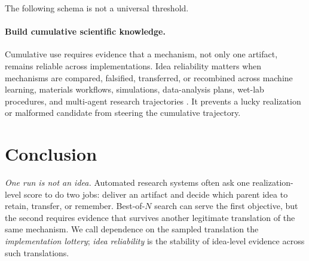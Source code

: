 \documentclass[letterpaper]{article}
\begin{document}
\noindent The following schema is not a universal threshold.

\noindent{}

\paragraph{Build cumulative scientific knowledge.} Cumulative use requires evidence that a mechanism, not only one artifact, remains reliable across implementations. Idea reliability matters when mechanisms are compared, falsified, transferred, or recombined across machine learning, materials workflows, simulations, data-analysis plans, wet-lab procedures, and multi-agent research trajectories \cite{wang2023scientificdiscovery,gottweis2026coscientist}. It prevents a lucky realization or malformed candidate from steering the cumulative trajectory.

\section{Conclusion}

\emph{One run is not an idea.} Automated research systems often ask one realization-level score to do two jobs: deliver an artifact and decide which parent idea to retain, transfer, or remember. Best-of-$N$ search can serve the first objective, but the second requires evidence that survives another legitimate translation of the same mechanism. We call dependence on the sampled translation the \emph{implementation lottery}; \emph{idea reliability} is the stability of idea-level evidence across such translations.
\end{document}
